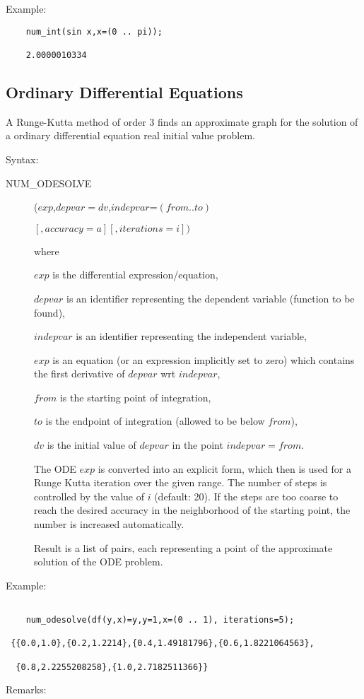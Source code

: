 Example:

\begin{verbatim}
    num_int(sin x,x=(0 .. pi));

    2.0000010334
\end{verbatim}

\subsection{Ordinary Differential Equations}

A Runge-Kutta method of order 3 finds an approximate graph for
the solution of a ordinary differential equation
real initial value problem.

Syntax:
\begin{description}
\item[NUM\_ODESOLVE]($exp$,$depvar=dv$,$indepvar$=$(from .. to)$

$                   [,accuracy=a][,iterations=i]) $

where

$exp$ is the differential expression/equation,

$depvar$ is an identifier representing the dependent variable
(function to be found),

$indepvar$ is an identifier representing the independent variable,

$exp$ is an equation (or an expression implicitly set to zero) which
contains the first derivative of $depvar$ wrt $indepvar$,

$from$ is the starting point of integration,

$to$ is the endpoint of integration (allowed to be below $from$),

$dv$ is the initial value of $depvar$ in the point $indepvar=from$.

The ODE $exp$ is converted into an explicit form, which then is
used for a Runge Kutta iteration over the given range. The
number of steps is controlled by the value of $i$
(default: 20).
If the steps are too coarse to reach the desired
accuracy in the neighborhood of the starting point, the number is
increased automatically.

Result is a list of pairs, each representing a point of the
approximate solution of the ODE problem.
\end{description}


Example:
\begin{verbatim}

    num_odesolve(df(y,x)=y,y=1,x=(0 .. 1), iterations=5);

 {{0.0,1.0},{0.2,1.2214},{0.4,1.49181796},{0.6,1.8221064563},

  {0.8,2.2255208258},{1.0,2.7182511366}}

\end{verbatim}
Remarks:

